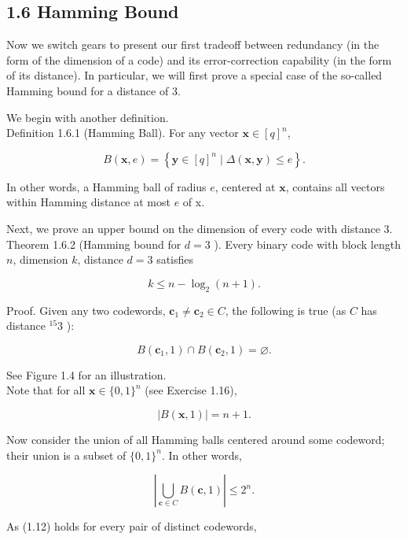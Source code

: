 \documentclass[10pt]{article}
\begin{document}
\subsection*{1.6 Hamming Bound}
Now we switch gears to present our first tradeoff between redundancy (in the form of the dimension of a code) and its error-correction capability (in the form of its distance). In particular, we will first prove a special case of the so-called Hamming bound for a distance of 3.

We begin with another definition.\\
Definition 1.6.1 (Hamming Ball). For any vector $\mathbf{x} \in[q]^{n}$,

$$
B(\mathbf{x}, e)=\left\{\mathbf{y} \in[q]^{n} \mid \Delta(\mathbf{x}, \mathbf{y}) \leq e\right\} .
$$

In other words, a Hamming ball of radius $e$, centered at $\mathbf{x}$, contains all vectors within Hamming distance at most $e$ of x.

Next, we prove an upper bound on the dimension of every code with distance 3.\\
Theorem 1.6.2 (Hamming bound for $d=3$ ). Every binary code with block length $n$, dimension $k$, distance $d=3$ satisfies

$$
k \leq n-\log _{2}(n+1) .
$$

Proof. Given any two codewords, $\mathbf{c}_{1} \neq \mathbf{c}_{2} \in C$, the following is true (as $C$ has distance ${ }^{15} 3$ ):


\begin{equation*}
B\left(\mathbf{c}_{1}, 1\right) \cap B\left(\mathbf{c}_{2}, 1\right)=\varnothing . \tag{1.12}
\end{equation*}


See Figure 1.4 for an illustration.\\
Note that for all $\mathbf{x} \in\{0,1\}^{n}$ (see Exercise 1.16),


\begin{equation*}
|B(\mathbf{x}, 1)|=n+1 . \tag{1.13}
\end{equation*}


Now consider the union of all Hamming balls centered around some codeword; their union is a subset of $\{0,1\}^{n}$. In other words,


\begin{equation*}
\left|\bigcup_{\mathbf{c} \in C} B(\mathbf{c}, 1)\right| \leq 2^{n} . \tag{1.14}
\end{equation*}


As (1.12) holds for every pair of distinct codewords,
\end{document}
